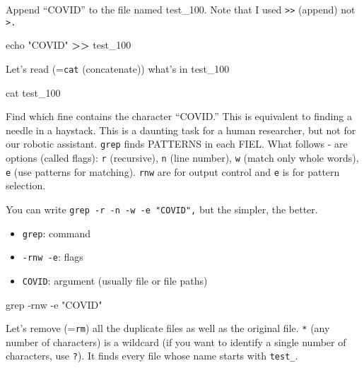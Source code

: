 \documentclass[
]{book}
\newenvironment{Shaded}{\begin{snugshade}}{\end{snugshade}}
\newcommand{\AttributeTok}[1]{\textcolor[rgb]{0.77,0.63,0.00}{#1}}
\newcommand{\BuiltInTok}[1]{#1}
\newcommand{\FunctionTok}[1]{\textcolor[rgb]{0.00,0.00,0.00}{#1}}
\newcommand{\NormalTok}[1]{#1}
\newcommand{\OperatorTok}[1]{\textcolor[rgb]{0.81,0.36,0.00}{\textbf{#1}}}
\newcommand{\StringTok}[1]{\textcolor[rgb]{0.31,0.60,0.02}{#1}}
\begin{document}
Append ``COVID'' to the file named test\_100. Note that I used \texttt{\textgreater{}\textgreater{}} (append) not \texttt{\textgreater{}.}

\begin{Shaded}
\begin{Highlighting}[]

\BuiltInTok{echo} \StringTok{"COVID"} \OperatorTok{\textgreater{}\textgreater{}}\NormalTok{ test\_100 }
\end{Highlighting}
\end{Shaded}

Let's read (=\texttt{cat} (concatenate)) what's in test\_100

\begin{Shaded}
\begin{Highlighting}[]

\FunctionTok{cat}\NormalTok{ test\_100 }
\end{Highlighting}
\end{Shaded}

Find which fine contains the character ``COVID.'' This is equivalent to finding a needle in a haystack. This is a daunting task for a human researcher, but not for our robotic assistant. \texttt{grep} finds PATTERNS in each FIEL. What follows - are options (called flags): \texttt{r} (recursive), \texttt{n} (line number), \texttt{w} (match only whole words), \texttt{e} (use patterns for matching). \texttt{rnw} are for output control and \texttt{e} is for pattern selection.

You can write \texttt{grep\ -r\ -n\ -w\ -e\ "COVID",} but the simpler, the better.

\begin{itemize}
\item
  \texttt{grep}: command
\item
  \texttt{-rnw\ -e}: flags
\item
  \texttt{COVID}: argument (usually file or file paths)
\end{itemize}

\begin{Shaded}
\begin{Highlighting}[]

\FunctionTok{grep} \AttributeTok{{-}rnw} \AttributeTok{{-}e} \StringTok{"COVID"} 
\end{Highlighting}
\end{Shaded}

Let's remove (=\texttt{rm}) all the duplicate files as well as the original file. \texttt{*} (any number of characters) is a wildcard (if you want to identify a single number of characters, use \texttt{?}). It finds every file whose name starts with \texttt{test\_}.
\end{document}
